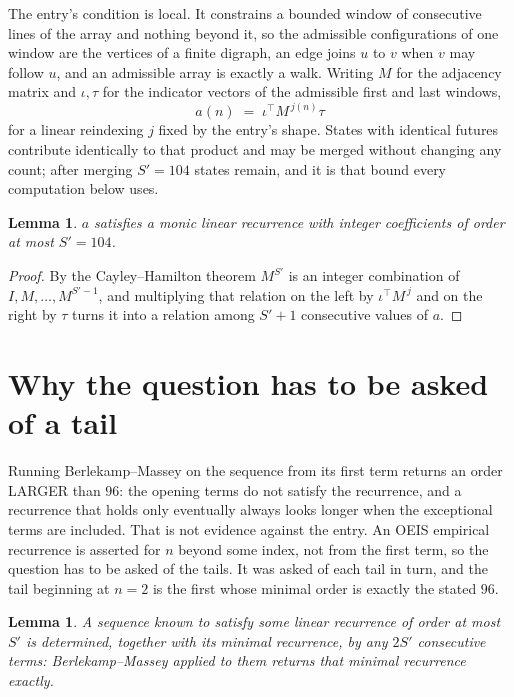 \documentclass[11pt,a4paper]{article}
\theoremstyle{plain}
\newtheorem{lemma}[theorem]{Lemma}
\theoremstyle{definition}
\begin{document}
The entry's condition is local. It constrains a bounded window of consecutive lines of the
array and nothing beyond it, so the admissible configurations of one window are the vertices of
a finite digraph, an edge joins $u$ to $v$ when $v$ may follow $u$, and an admissible array is
exactly a walk. Writing $M$ for the adjacency matrix and $\iota,\tau$ for the indicator vectors
of the admissible first and last windows,
\[
a(n)\;=\;\iota^{\!\top}M^{\,j(n)}\tau
\]
for a linear reindexing $j$ fixed by the entry's shape. States with identical futures
contribute identically to that product and may be merged without changing any count; after
merging $S'=104$ states remain, and it is that bound every computation below uses.

\begin{lemma}\label{lem:cf}
$a$ satisfies a monic linear recurrence with integer coefficients of order at most $S'=104$.
\end{lemma}

\begin{proof}
By the Cayley--Hamilton theorem $M^{S'}$ is an integer combination of $I,M,\dots,M^{S'-1}$,
and multiplying that relation on the left by $\iota^{\!\top}M^{\,j}$ and on the right by
$\tau$ turns it into a relation among $S'+1$ consecutive values of $a$.
\end{proof}

\section{Why the question has to be asked of a tail}

Running Berlekamp--Massey on the sequence from its first term returns an order LARGER than $96$: the opening terms do not satisfy the recurrence, and a recurrence that holds only eventually always looks longer when the exceptional terms are included. That is not evidence against the entry. An OEIS empirical recurrence is asserted for $n$ beyond some index, not from the first term, so the question has to be asked of the tails. It was asked of each tail in turn, and the tail beginning at $n=2$ is the first whose minimal order is exactly the stated $96$.

\begin{lemma}\label{lem:bm}
A sequence known to satisfy some linear recurrence of order at most $S'$ is determined,
together with its minimal recurrence, by any $2S'$ consecutive terms: Berlekamp--Massey applied
to them returns that minimal recurrence exactly.
\end{lemma}
\end{document}
